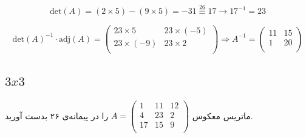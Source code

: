\documentclass{article}
\newcommand{\modts}{\overset{26}{\equiv}}
\begin{document}
\begin{equation*}
\mathrm{det}(A) = (2\times5) - (9\times5) = -31 \modts 17 \rightarrow 17^{-1} = 23
\end{equation*}

\begin{equation*}
\mathrm{det}(A)^{-1} \cdot \mathrm{adj}(A) = 
\begin{pmatrix}
23\times5 & 23\times(-5) \\
23\times(-9) & 23\times2 \\
\end{pmatrix} \Rightarrow 
A^{-1} = 
\begin{pmatrix}
11 & 15 \\
1 & 20 \\
\end{pmatrix}
\end{equation*}

\subsection{$3x3$}
ماتریس معکوس 
$A = 
\begin{pmatrix}
1 & 11 & 12 \\
4 & 23 & 2 \\
17 & 15 & 9 \\
\end{pmatrix}$
را در پیمانه‌ی ۲۶ بدست آورید.
\end{document}
